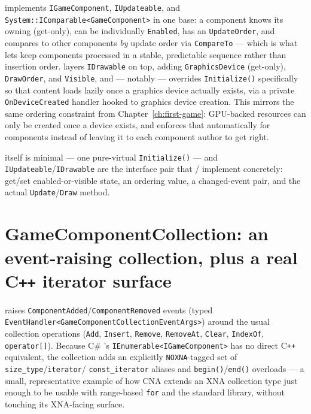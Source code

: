  implements \texttt{IGameComponent}, \texttt{IUpdateable}, and
\texttt{System::IComparable<GameComponent>} in one base: a component knows its owning
 (get-only), can be individually \texttt{Enabled}, has an
\texttt{UpdateOrder}, and compares to other components \emph{by} update order via
\texttt{CompareTo} --- which is what lets  keep components
processed in a stable, predictable sequence rather than insertion order.
 layers \texttt{IDrawable} on top, adding
\texttt{GraphicsDevice} (get-only), \texttt{DrawOrder}, and \texttt{Visible}, and --- notably
--- overrides \texttt{Initialize()} specifically so that content loads lazily once a graphics
device actually exists, via a private \texttt{OnDeviceCreated} handler hooked to graphics
device creation. This mirrors the same ordering constraint from
Chapter~\ref{ch:first-game}: GPU-backed resources can only be created once a device exists,
and  enforces that automatically for components instead of
leaving it to each component author to get right.

 itself is minimal --- one pure-virtual \texttt{Initialize()} ---
and \texttt{IUpdateable}/\texttt{IDrawable} are the interface pair that
/ implement concretely: get/set
enabled-or-visible state, an ordering value, a changed-event pair, and the actual
\texttt{Update}/\texttt{Draw} method.

\section{GameComponentCollection: an event-raising collection, plus a real C\texttt{++} iterator surface}

 raises \texttt{ComponentAdded}/\texttt{ComponentRemoved}
events (typed \texttt{EventHandler<GameComponentCollectionEventArgs>}) around the usual
collection operations (\texttt{Add}, \texttt{Insert}, \texttt{Remove}, \texttt{RemoveAt},
\texttt{Clear}, \texttt{IndexOf}, \texttt{operator[]}). Because C\# 's
\texttt{IEnumerable<IGameComponent>} has no direct C\texttt{++} equivalent, the collection
adds an explicitly \texttt{NOXNA}-tagged set of \texttt{size\_type}/\texttt{iterator}/%
\texttt{const\_iterator} aliases and \texttt{begin()}/\texttt{end()} overloads --- a small,
representative example of how CNA extends an XNA collection type just enough to be usable
with range-based \texttt{for} and the standard library, without touching its XNA-facing
surface.

